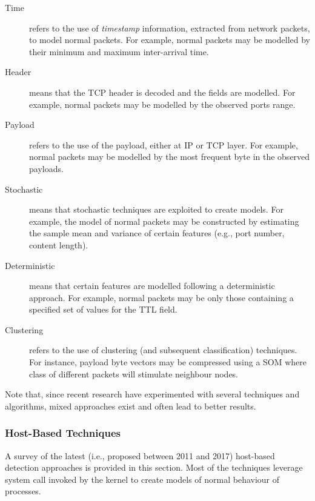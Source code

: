 \documentclass[12pt]{article}
\theoremstyle{definition}
\begin{document}
			\begin{description}
				\item[Time] refers to the use of \emph{timestamp} information,
				extracted from network packets, to model normal packets. For example,
				normal packets may be modelled by their minimum and maximum inter-arrival time.
				\item[Header] means that the TCP header is decoded and the fields are modelled. For example, normal packets may be modelled by
				the observed ports range.
				\item[Payload] refers to the use of the payload, either at
				IP or TCP layer. For example, normal packets may be modelled by the most frequent byte in the observed payloads.
				\item[Stochastic] means that stochastic techniques are exploited to
				create models. For example, the model of normal packets may be constructed by estimating the sample mean and variance of certain features (e.g., port number, content length).
				\item[Deterministic] means that certain features are modelled following
				a deterministic approach. For example, normal packets may be only
				those containing a specified set of values for the TTL field.
				\item[Clustering] refers to the use of clustering (and subsequent classification) techniques. For instance, payload byte vectors may be
				compressed using a SOM where class of different packets will stimulate neighbour nodes.
			\end{description}
			
			Note that, since recent research have experimented with several
			techniques and algorithms, mixed approaches exist and often lead to
			better results.
			\subsubsection{Host-Based Techniques}
			A survey of the latest (i.e., proposed
			between 2011 and 2017) host-based detection approaches is provided in
			this section. Most of the techniques leverage system call invoked by
			the kernel to create models of normal behaviour of processes.
			
\end{document}
